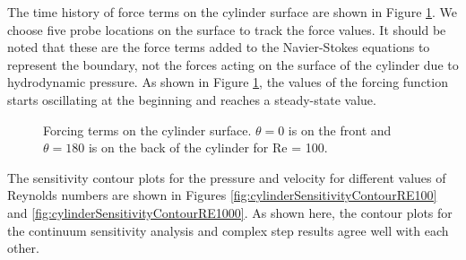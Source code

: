 \documentclass[12pt]{aiaa-pretty}
\begin{document}
The time history of force terms on the cylinder surface are shown in Figure \ref{fig:cylinderForceTerms}. We choose five probe locations on the surface to track the force values. It should be noted that these are the force terms added to the Navier-Stokes equations to represent the boundary, not the forces acting on the surface of the cylinder due to hydrodynamic pressure. As shown in Figure \ref{fig:cylinderForceTerms}, the values of the forcing function starts oscillating at the beginning and reaches a steady-state value.

%
\begin{figure}[H]
	\centering
	\quad
	\caption{Forcing terms on the cylinder surface. $\theta = 0$ is on the front and $\theta = 180$ is on the back of the cylinder for Re = 100.}
	\label{fig:cylinderForceTerms}
\end{figure}
%

The sensitivity contour plots for the pressure and velocity for different values of Reynolds numbers are shown in Figures \ref{fig:cylinderSensitivityContourRE100} and \ref{fig:cylinderSensitivityContourRE1000}. As shown here, the contour plots for the continuum sensitivity analysis and complex step results agree well with each other.
\end{document}
